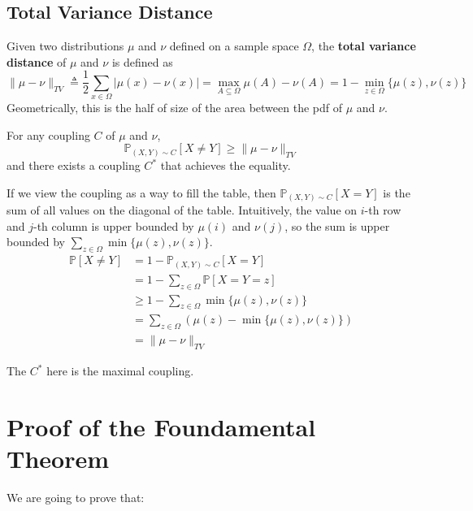     \subsection{Total Variance Distance}
        \begin{definition}
            Given two distributions $\mu$ and $\nu$ defined on a sample space $\Omega$, the \textbf{total variance distance} of $\mu$ and $\nu$ is defined as
            \[ \|\mu - \nu \|_{TV} \triangleq \frac{1}{2}\sum_{x\in\Omega}|\mu(x)-\nu(x)| = \max_{A\subseteq\Omega} \mu(A)-\nu(A) = 1-\min_{z\in\Omega}\{ \mu(z), \nu(z) \} \]
            Geometrically, this is the half of size of the area between the pdf of $\mu$ and $\nu$.
        \end{definition}
        \begin{lemma}\label{CouplingLemma}
            For any coupling $C$ of $\mu$ and $\nu$,
            \[ \mathbb{P}_{(X,Y)\sim C}[X \neq Y] \ge \|\mu - \nu \|_{TV} \]
            and there exists a coupling $C^{*}$ that achieves the equality.
        \end{lemma}
        \begin{sketchproof}
            If we view the coupling as a way to fill the table, then $\mathbb{P}_{(X,Y) \sim C}[X=Y]$ is the sum of all values on the diagonal of the table. Intuitively, the value on $i$-th row and $j$-th column is upper bounded by $\mu(i)$ and $\nu(j)$, so the sum is upper bounded by $\sum_{z\in\Omega}\min\{\mu(z), \nu(z)\}$.
            \begin{align*}
                \mathbb{P}[X \neq Y] &= 1 - \mathbb{P}_{(X,Y) \sim C}[X = Y] \\
                &= 1 - \sum_{z \in \Omega}\mathbb{P}[X=Y=z] \\
                &\ge 1 - \sum_{z \in \Omega}\min \{\mu(z), \nu(z)\}\\
                &= \sum_{z \in \Omega}\left( \mu(z) - \min\{\mu(z),\nu(z)\} \right)\\
                &= \| \mu - \nu \|_{TV}
            \end{align*}
        \end{sketchproof}
        \begin{remark}
            The $C^*$ here is the maximal coupling.
        \end{remark}



\section{Proof of the Foundamental Theorem}
    We are going to prove that:
